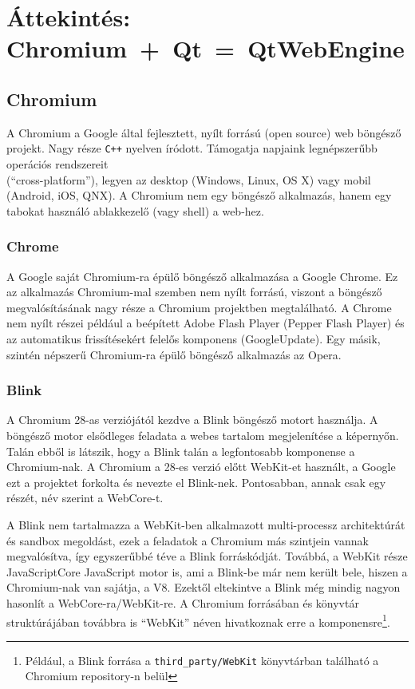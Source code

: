 \documentclass[12pt]{report}
\begin{document}
\chapter{Áttekintés: \mbox{Chromium + Qt = QtWebEngine}}

\section{Chromium}
A Chromium a Google által fejlesztett, nyílt forrású (open source) web böngésző projekt. Nagy
része \texttt{C++} nyelven íródott. Támogatja napjaink legnépszerűbb operációs rendszereit \\
(``cross-platform''), legyen az desktop (Windows, Linux, OS X) vagy mobil (Android, iOS,
QNX).
A Chromium nem egy böngésző alkalmazás, hanem egy tabokat használó ablakkezelő (vagy shell)
a web-hez.
\cite{bib:wiki-chromium}

\subsection{Chrome}
A Google saját Chromium-ra épülő böngésző alkalmazása a Google Chrome.
Ez az alkalmazás Chromium-mal szemben nem nyílt forrású, viszont a böngésző
megvalósításának nagy része a Chromium projektben megtalálható.
A Chrome nem nyílt részei például a beépített Adobe Flash Player (Pepper Flash Player)
és az automatikus frissítésekért felelős komponens (GoogleUpdate). \cite{bib:wiki-chrome}
Egy másik, szintén népszerű Chromium-ra épülő böngésző alkalmazás az Opera.

\subsection{Blink}
A Chromium 28-as verziójától kezdve a Blink böngésző motort használja.
A böngésző motor elsődleges feladata a webes tartalom megjelenítése a képernyőn. Talán
ebből is látszik, hogy a Blink talán a legfontosabb komponense a Chromium-nak.
A Chromium a 28-es verzió előtt WebKit-et használt, a Google ezt a projektet forkolta és
nevezte el Blink-nek. Pontosabban, annak csak egy részét, név szerint a WebCore-t.
\cite{bib:wiki-blink}

A Blink nem tartalmazza a WebKit-ben alkalmazott multi-processz architektúrát és sandbox
megoldást, ezek a feladatok a Chromium más szintjein vannak megvalósítva, így egyszerűbbé
téve a Blink forráskódját.
Továbbá, a WebKit része JavaScriptCore JavaScript motor is, ami a Blink-be már nem került
bele, hiszen a Chromium-nak van sajátja, a V8. Ezektől eltekintve a Blink még mindig nagyon
hasonlít a WebCore-ra/WebKit-re. A Chromium forrásában és könyvtár struktúrájában továbbra is
``WebKit'' néven hivatkoznak erre a komponensre\footnote{Például, a Blink forrása a
\texttt{third\_party/WebKit} könyvtárban található a Chromium repository-n belül}.
\cite{bib:chromium-displays-web-pages, bib:chromium-blink}
\end{document}
